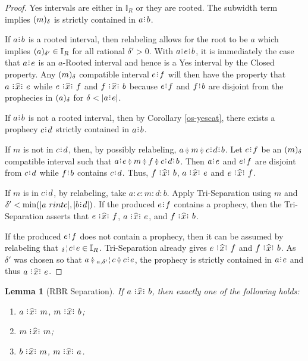 \documentclass[12pt]{article}
\newtheorem{lemma}{Lemma}[section]
\begin{document}
\begin{proof}
    Yes intervals are either in $\mathbb{I}_R$ or they are rooted. The subwidth term implies $\halo{m}$ is strictly contained in $a\rint b$. 
    
    If $a \rint b$ is a rooted interval, then relabeling allows for the root to be $a$ which implies $\halo[\delta']{a} \in \mathbb{I}_R$ for all rational $\delta' >0$. With $a\rint e\rint b$, it is immediately the case that $a\rint e$ is an $a$-Rooted interval and hence is a Yes interval by the Closed property. Any $\halo{m}$ compatible interval $e\rint f$ will then have the property that $a \xora e$ while \sout{$e\xora f$} and \sout{$f\xora b$} because $e\rint f$ and $f\rint b$ are disjoint from the prophecies in $\halo{a}$ for $\delta < |a\rint e|$.
 
    If $a \rint b$ is not a rooted interval, then by Corollary \ref{os-yescat}, there exists a prophecy $c \rint d$ strictly contained in $a \rint b$. 
    
    If $m$ is not in $c\rint d$, then, by possibly relabeling, $a\betneq m \betneq c\rint d\rint b$.  Let $e\rint f$ be an $\halo{m}$ compatible interval such that $a\rint e\betneq m\betneq f \betneq c\rint d\rint b$. Then $a\rint e$ and $e\rint f$ are disjoint from $c\rint d$ while $f\rint b$ contains $c\rint d$. Thus, $f \xora b$, \sout{$a\xora e$} and \sout{$e\xora f$}.

    If $m$ is in $c\rint d$, by relabeling, take $a:c:m:d:b$. Apply Tri-Separation using $m$ and  $\delta' < \min(|a\ rint c|, |b \rint d|)$.  If the produced $e\rint f$ contains a prophecy, then the Tri-Separation asserts that  $e \xora f$, \sout{$a\xora e$}, and \sout{$f\xora b$}. 
    
    If the produced $e\rint f$ does not contain a prophecy, then  it can be assumed by relabeling that $\fuzbleft[\delta]{c}\rint e \in \mathbb{I}_R$. Tri-Separation already gives \sout{$e\xora f$} and \sout{$f\xora b$}. As $\delta'$ was chosen so that $a \betneq \fuzbleft[a, \delta']{c} \betneq c \rint e$, the prophecy is strictly contained in $a\rint e$ and thus $a \xora e$. 

\end{proof}

\begin{lemma}[RBR Separation]\label{os-intsep}
  If $a \xora b$, then exactly one of the following holds:  
  \begin{enumerate}
        \item $a\xora m$, \sout{$m \xora b$};
        \item $m \xora m$; 
        \item $b \xora m$, \sout{$m \xora a$}.
    \end{enumerate}
\end{lemma}
\end{document}
